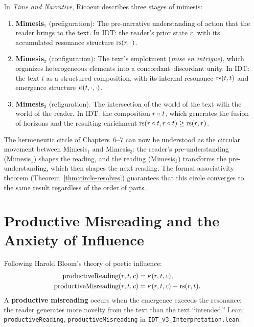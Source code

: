 \begin{interpretation}
\label{interp:threefold-mimesis}
In \textit{Time and Narrative}, Ricoeur describes three stages of mimesis:

\begin{enumerate}
\item \textbf{Mimesis$_1$} (prefiguration): The pre-narrative understanding
of action that the reader brings to the text.  In IDT: the reader's prior
state $r$, with its accumulated resonance structure $\mathrm{rs}(r, \cdot)$.

\item \textbf{Mimesis$_2$} (configuration): The text's emplotment
(\textit{mise en intrigue}), which organizes heterogeneous elements into
a concordant--discordant unity.  In IDT: the text $t$ as a structured
composition, with its internal resonance $\mathrm{rs}(t, t)$ and emergence
structure $\kappa(t, \cdot, \cdot)$.

\item \textbf{Mimesis$_3$} (refiguration): The intersection of the world
of the text with the world of the reader.  In IDT: the composition
$r \circ t$, which generates the fusion of horizons and the resulting
enrichment $\mathrm{rs}(r \circ t, r \circ t) \geq \mathrm{rs}(r, r)$.
\end{enumerate}

The hermeneutic circle of Chapters~6--7 can now be understood as the
circular movement between Mimesis$_1$ and Mimesis$_3$: the reader's
pre-understanding (Mimesis$_1$) shapes the reading, and the reading
(Mimesis$_3$) transforms the pre-understanding, which then shapes the
next reading.  The formal associativity theorem
(Theorem~\ref{thm:circle-resolves}) guarantees that this circle converges
to the same result regardless of the order of parts.
\end{interpretation}

\section{Productive Misreading and the Anxiety of Influence}

\begin{definition}
\label{def:productive-reading}
Following Harold Bloom's theory of poetic influence:
\begin{align}
\mathrm{productiveReading}(r, t, c) &= \kappa(r, t, c), \\
\mathrm{productiveMisreading}(r, t, c) &= \kappa(r, t, c) - \mathrm{rs}(r, t).
\end{align}
A \textbf{productive misreading} occurs when the emergence exceeds the resonance:
the reader generates more novelty from the text than the text ``intended.''
Lean: \texttt{productiveReading}, \texttt{productiveMisreading} in
\texttt{IDT\_v3\_Interpretation.lean}.
\end{definition}

